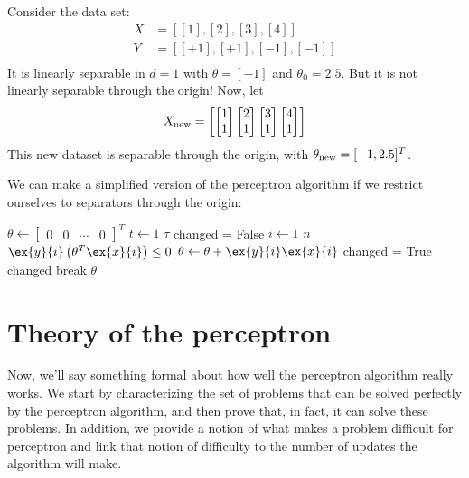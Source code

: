 Consider the data set:
\begin{align*}
  X & = [[1], [2], [3], [4]]     \\
  Y & = [[+1], [+1], [-1], [-1]] \\
\end{align*}
It is linearly separable in $d = 1$ with $\theta = [-1]$ and $\theta_0
  = 2.5$.  But it is not linearly separable through the origin!   Now,
let
\[X_{\rm new} = \begin{bmatrix}
    \begin{bmatrix} 1 \\ 1 \end{bmatrix}
    \begin{bmatrix} 2 \\ 1 \end{bmatrix}
    \begin{bmatrix} 3 \\ 1 \end{bmatrix}
    \begin{bmatrix} 4 \\ 1 \end{bmatrix}
  \end{bmatrix}\]
This new dataset is separable through the origin, with $\theta_{\rm
    new} = [-1, 2.5]^T$.



We can make a simplified version of the perceptron algorithm if we
restrict ourselves to separators through the origin: 
\begin{codebox}
  \li $\theta \gets
    \begin{bmatrix}
      0 & 0 & \cdots & 0
    \end{bmatrix}^T$
  \li \For $t \gets 1$ \To $\tau$
  \li   \Do
  changed = False
  \li      \For $i \gets 1$ \To $n$
  \li       \Do
  \If $\ex{y}{i}\left(\theta^T\ex{x}{i}\right) \le 0$
  \li           \Then
  $\theta \gets \theta + \ex{y}{i}\ex{x}{i}$
  \li             changed = True
  \End
  \End
  \li      {} changed
  \li          \Then
  break
  \End
  \li \Return $\theta$
\end{codebox}


\section{Theory of the perceptron}
Now, we'll say something formal about how well the perceptron
algorithm really works.  We start by characterizing the set of
problems that can be solved perfectly by the perceptron algorithm, and
then prove that, in fact, it can solve these problems.  In addition,
we provide a notion of what makes a problem difficult for perceptron
and link that notion of difficulty to the number of updates the
algorithm will make.

